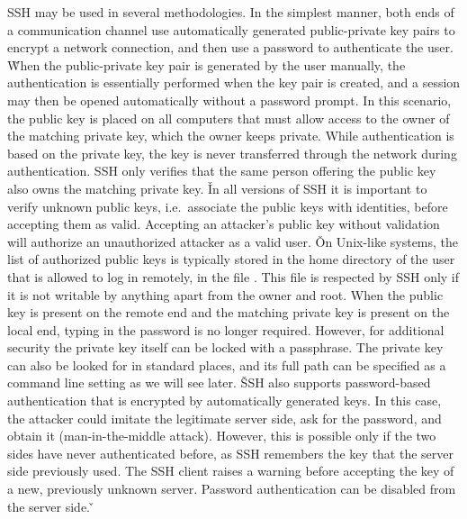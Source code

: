 SSH may be used in several methodologies. In the simplest manner, both ends of a communication channel use
automatically generated public-private key pairs to encrypt a network connection, and then use a password to
authenticate the user. \v

When the public-private key pair is generated by the user manually, the authentication is essentially performed when
the key pair is created, and a session may then be opened automatically without a password prompt. In this scenario,
the public key is placed on all computers that must allow access to the owner of the matching private key, which the
owner keeps private. While authentication is based on the private key, the key is never transferred through the
network during authentication. SSH only verifies that the same person offering the public key also owns the matching
private key. \v

In all versions of SSH it is important to verify unknown public keys, i.e.\ associate the public keys with identities,
before accepting them as valid. Accepting an attacker's public key without validation will authorize an
unauthorized attacker as a valid user. \v

On Unix-like systems, the list of authorized public keys is typically stored in the home directory of the user that is
allowed to log in remotely, in the file . This file is respected by SSH only if it is not writable by
anything apart from the owner and root. When the public key is present on the remote end and the matching private key
is present on the local end, typing in the password is no longer required. However, for additional security the private
key itself can be locked with a passphrase. The private key can also be looked for in standard places, and its full path
can be specified as a command line setting as we will see later. \v

SSH also supports password-based authentication that is encrypted by automatically generated keys. In this case, the
attacker could imitate the legitimate server side, ask for the password, and obtain it (man-in-the-middle attack).
However, this is possible only if the two sides have never authenticated before, as SSH remembers the key that the
server side previously used. The SSH client raises a warning before accepting the key of a new, previously unknown
server. Password authentication can be disabled from the server side. \v

